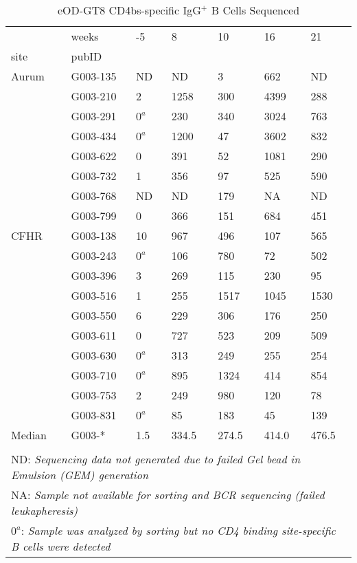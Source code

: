 \documentclass{article}
\begin{document}
    \begin{table}
\centering
\caption{eOD-GT8 CD4bs-specific IgG$^{+}$ B Cells Sequenced}
\begin{tabular}{lllllll}
\toprule
       & weeks &     -5 &      8 &     10 &     16 &     21 \\
site & pubID &        &        &        &        &        \\
\midrule
Aurum & G003-135 &  ND &  ND &  3 &  662 &  ND \\
       & G003-210 &  2 &  1258 &  300 &  4399 &  288 \\
       & G003-291 &  $0^a$ &  230 &  340 &  3024 &  763 \\
       & G003-434 &  $0^a$ &  1200 &  47 &  3602 &  832 \\
       & G003-622 &  0 &  391 &  52 &  1081 &  290 \\
       & G003-732 &  1 &  356 &  97 &  525 &  590 \\
       & G003-768 &  ND &  ND &  179 &  NA &  ND \\
       & G003-799 &  0 &  366 &  151 &  684 &  451 \\
\midrule
CFHR & G003-138 &  10 &  967 &  496 &  107 &  565 \\
       & G003-243 &  $0^a$ &  106 &  780 &  72 &  502 \\
       & G003-396 &  3 &  269 &  115 &  230 &  95 \\
       & G003-516 &  1 &  255 &  1517 &  1045 &  1530 \\
       & G003-550 &  6 &  229 &  306 &  176 &  250 \\
       & G003-611 &  0 &  727 &  523 &  209 &  509 \\
       & G003-630 &  $0^a$ &  313 &  249 &  255 &  254 \\
       & G003-710 &  $0^a$ &  895 &  1324 &  414 &  854 \\
       & G003-753 &  2 &  249 &  980 &  120 &  78 \\
       & G003-831 &  $0^a$ &  85 &  183 &  45 &  139 \\
\midrule
Median & G003-* &  1.5 &  334.5 &  274.5 &  414.0 &  476.5 \\
\bottomrule
\multicolumn{7}{l}{\tiny } \\
\multicolumn{7}{l}{\tiny ND: \textit{Sequencing data not generated due to failed Gel bead in Emulsion (GEM) generation}} \\
\multicolumn{7}{l}{\tiny NA: \textit{Sample not available for sorting and BCR sequencing (failed leukapheresis)}} \\
\multicolumn{7}{l}{\tiny $0^a$: \textit{Sample was analyzed by sorting but no CD4 binding site-specific B cells were detected}} \\
\end{tabular}
\end{table}
\end{document}
